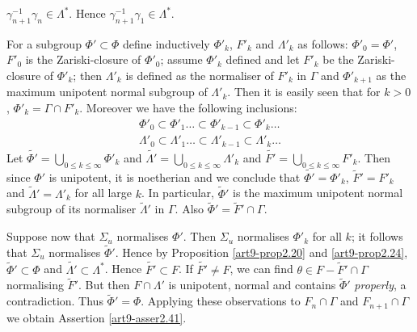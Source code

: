 \setcounter{assertion}{40}
\begin{assertion}\label{art9-asser2.41}
$\gamma^{-1}_{n+1} \gamma_n \in \Lambda^\ast$. Hence $\gamma^{-1}_{n+1} \gamma_1 \in \Lambda^\ast$.
\end{assertion}

For a subgroup $\Phi' \subset \Phi$ define inductively $\Phi'_k$, $F'_k$ and $\Lambda'_k$ as follows: $\Phi'_0 = \Phi'$, $F'_0$ is the Zariski-closure of $\Phi'_0$; assume $\Phi'_k$ defined and let $F'_k$ be the Zariski-closure of $\Phi'_k$; then $\Lambda'_k$ is defined as the normaliser of $F'_k$ in $\Gamma$ and $\Phi'_{k+1}$ as the maximum unipotent normal subgroup of $\Lambda'_k$. Then it is easily seen that for $k > 0$, $\Phi'_k = \Gamma \cap F'_k$. Moreover we have the following inclusions:
\begin{align*}
\Phi'_0 \subset \Phi'_1 \ldots \subset \Phi'_{k-1} \subset \Phi'_k\ldots\\
\Lambda'_0 \subset \Lambda'_1 \ldots \subset \Lambda'_{k-1} \subset \Lambda'_k\ldots 
\end{align*}
Let $\tilde{\Phi'} = \bigcup\limits_{0 \leqslant k \leqslant \infty} \Phi'_k$ and $\tilde{\Lambda'} = \bigcup\limits_{0 \leqslant k \leqslant \infty} \Lambda'_k$ and $\tilde{F'} = \bigcup\limits_{0 \leqslant k \leqslant \infty} F'_k$. Then since $\Phi'$ is unipotent, it is noetherian and we conclude that $\tilde{\Phi'} = \Phi'_k$, $\tilde{F}' = F'_k$ and $\tilde{\Lambda}' = \Lambda'_k$ for all large $k$. In particular, $\tilde{\Phi}'$ is the maximum unipotent normal subgroup of its normaliser $\tilde{\Lambda}'$ in $\Gamma$. Also $\tilde{\Phi}' = \tilde{F}' \cap \Gamma$.

Suppose now that $\Sigma_u$ normalises $\Phi'$. Then $\Sigma_u$ normalises $\Phi'_k$ for all $k$; it follows that $\Sigma_u$ normalises $\tilde{\Phi}'$. Hence by Proposition \ref{art9-prop2.20} and \ref{art9-prop2.24}, $\tilde{\Phi}' \subset \Phi$ and $\tilde{\Lambda'} \subset \Lambda^\ast$. Hence $\tilde{F'} \subset F$. If $\tilde{F'} \neq F$, we can find $\theta \in F-\tilde{F}' \cap \Gamma$ normalising $\tilde{F}'$. But then $F \cap \Lambda'$ is unipotent, normal and contains $\tilde{\Phi}'$ \textit{properly}, a contradiction. Thus $\tilde{\Phi}' = \Phi$. Applying these observations to $F_n \cap \Gamma$ and $F_{n+1} \cap \Gamma$ we obtain Assertion \ref{art9-asser2.41}.

\setcounter{subsection}{41}
